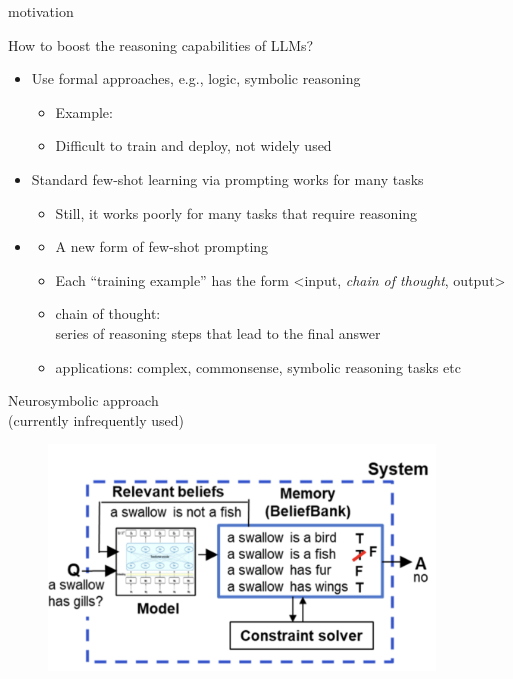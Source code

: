 \begin{vbframe}{\cotpfull motivation}

\vfill

How to boost the reasoning capabilities of LLMs? 

\begin{itemize}
\item Use formal approaches, e.g., logic, symbolic reasoning
    \begin{itemize}
    \item Example: 
\item Difficult to train and deploy, not widely used
    \end{itemize}
\item Standard few-shot learning via prompting works for many tasks
    \begin{itemize}
    \item Still, it works poorly for many tasks that require reasoning
    \end{itemize}
\item \cotp
    \begin{itemize}
    \item A new form of few-shot prompting
    \item Each ``training example'' has the form <input, \textit{chain of thought}, output>
    \item chain of thought:\\ series of reasoning steps that
    lead to the final answer
    \item applications: complex, commonsense, symbolic
    reasoning tasks etc
    \end{itemize}

\end{itemize}

\vfill

\end{vbframe}

\begin{frame}{Neurosymbolic approach\\ (currently
    infrequently used)}

\vfill
	
	\begin{figure}
		\centering
		\includegraphics[height = 6cm]{figure/beliefbank} 
	\end{figure}

\vfill

\end{frame}


